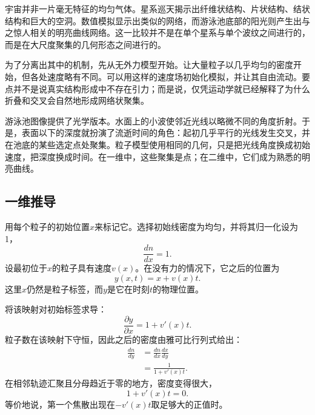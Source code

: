 宇宙并非一片毫无特征的均匀气体。星系巡天揭示出纤维状结构、片状结构、结状结构和巨大的空洞。数值模拟显示出类似的网络，而游泳池底部的阳光则产生出与之惊人相关的明亮曲线网络。这一比较并不是在单个星系与单个波纹之间进行的，而是在大尺度聚集的几何形态之间进行的。

为了分离出其中的机制，先从无外力模型开始。让大量粒子以几乎均匀的密度开始，但各处速度略有不同。可以用这样的速度场初始化模拟，并让其自由流动。要点并不是说真实结构形成中不存在引力；而是说，仅凭运动学就已经解释了为什么折叠和交叉会自然地形成网络状聚集。

\begin{classroomqa}
\end{classroomqa}

游泳池图像提供了光学版本。水面上的小波使邻近光线以略微不同的角度折射。于是，表面以下的深度就扮演了流逝时间的角色：起初几乎平行的光线发生交叉，并在池底的某些选定点处聚集。粒子模型使用相同的几何，只是把光线角度换成初始速度，把深度换成时间。在一维中，这些聚集是点；在二维中，它们成为熟悉的明亮曲线。

\subsection{一维推导}

用每个粒子的初始位置\(x\)来标记它。选择初始线密度为均匀，并将其归一化设为1，
\begin{equation}
\frac{dn}{dx}=1.
\label{eq:c09-initial-density}
\end{equation}
设最初位于\(x\)的粒子具有速度\(v(x)\)。在没有力的情况下，它之后的位置为
\begin{equation}
y(x,t)=x+v(x)t.
\label{eq:c09-ballistic-map}
\end{equation}
这里\(x\)仍然是粒子标签，而\(y\)是它在时刻\(t\)的物理位置。

将该映射对初始标签求导：
\begin{equation}
\frac{\partial y}{\partial x}
=1+v'(x)t.
\label{eq:c09-jacobian}
\end{equation}
粒子数在该映射下守恒，因此之后的密度由雅可比行列式给出：
\begin{align}
\frac{dn}{dy}
&=
\frac{dn}{dx}\frac{dx}{dy}\\
&=
\frac{1}{1+v'(x)t}.
\label{eq:c09-caustic-density}
\end{align}
在相邻轨迹汇聚且分母趋近于零的地方，密度变得很大，
\begin{equation}
1+v'(x)t=0.
\label{eq:c09-caustic-condition}
\end{equation}
等价地说，第一个焦散出现在\(-v'(x)t\)取足够大的正值时。

